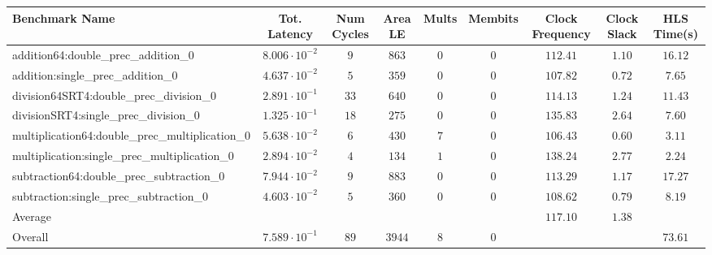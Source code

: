 \begin{tabular}{|l|c|c|c|c|c|c|c|c|}
\hline
Benchmark Name                                   & Tot. Latency            & Num Cycles & Area LE  & Mults & Membits & Clock Frequency & Clock Slack & HLS Time(s) \\
\hline
addition64:double\_prec\_addition\_0             & $ 8.006 \cdot 10^{-2} $ & $ 9      $ & $ 863  $ & $ 0 $ & $ 0   $ & $ 112.41      $ & $ 1.10    $ & $ 16.12   $ \\
addition:single\_prec\_addition\_0               & $ 4.637 \cdot 10^{-2} $ & $ 5      $ & $ 359  $ & $ 0 $ & $ 0   $ & $ 107.82      $ & $ 0.72    $ & $ 7.65    $ \\
division64SRT4:double\_prec\_division\_0         & $ 2.891 \cdot 10^{-1} $ & $ 33     $ & $ 640  $ & $ 0 $ & $ 0   $ & $ 114.13      $ & $ 1.24    $ & $ 11.43   $ \\
divisionSRT4:single\_prec\_division\_0           & $ 1.325 \cdot 10^{-1} $ & $ 18     $ & $ 275  $ & $ 0 $ & $ 0   $ & $ 135.83      $ & $ 2.64    $ & $ 7.60    $ \\
multiplication64:double\_prec\_multiplication\_0 & $ 5.638 \cdot 10^{-2} $ & $ 6      $ & $ 430  $ & $ 7 $ & $ 0   $ & $ 106.43      $ & $ 0.60    $ & $ 3.11    $ \\
multiplication:single\_prec\_multiplication\_0   & $ 2.894 \cdot 10^{-2} $ & $ 4      $ & $ 134  $ & $ 1 $ & $ 0   $ & $ 138.24      $ & $ 2.77    $ & $ 2.24    $ \\
subtraction64:double\_prec\_subtraction\_0       & $ 7.944 \cdot 10^{-2} $ & $ 9      $ & $ 883  $ & $ 0 $ & $ 0   $ & $ 113.29      $ & $ 1.17    $ & $ 17.27   $ \\
subtraction:single\_prec\_subtraction\_0         & $ 4.603 \cdot 10^{-2} $ & $ 5      $ & $ 360  $ & $ 0 $ & $ 0   $ & $ 108.62      $ & $ 0.79    $ & $ 8.19    $ \\
\hline
Average                                          & $                     $ & $        $ & $      $ & $   $ & $     $ & $ 117.10      $ & $ 1.38    $ & $         $ \\
\hline
Overall                                          & $ 7.589 \cdot 10^{-1} $ & $ 89     $ & $ 3944 $ & $ 8 $ & $ 0   $ & $             $ & $         $ & $ 73.61   $ \\
\hline
\end{tabular}
